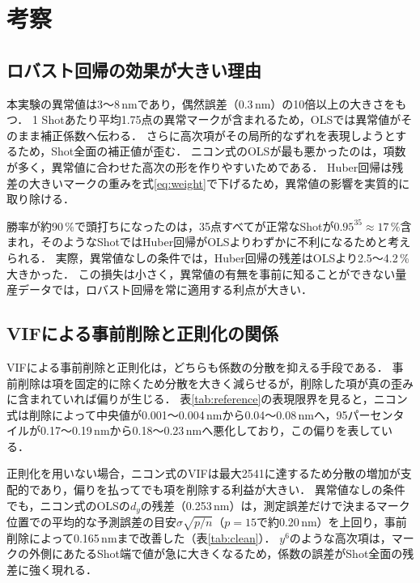 \documentclass[11pt,a4paper]{ltjsarticle}
\begin{document}
\section{考察}

\subsection{ロバスト回帰の効果が大きい理由}

本実験の異常値は3〜8\,nmであり，偶然誤差（0.3\,nm）の10倍以上の大きさをもつ．
1 Shotあたり平均1.75点の異常マークが含まれるため，OLSでは異常値がそのまま補正係数へ伝わる．
さらに高次項がその局所的なずれを表現しようとするため，Shot全面の補正値が歪む．
ニコン式のOLSが最も悪かったのは，項数が多く，異常値に合わせた高次の形を作りやすいためである．
Huber回帰は残差の大きいマークの重みを式\eqref{eq:weight}で下げるため，異常値の影響を実質的に取り除ける．

勝率が約90\,\%で頭打ちになったのは，35点すべてが正常なShotが$0.95^{35}\approx17\,\%$含まれ，そのようなShotではHuber回帰がOLSよりわずかに不利になるためと考えられる．
実際，異常値なしの条件では，Huber回帰の残差はOLSより2.5〜4.2\,\%大きかった．
この損失は小さく，異常値の有無を事前に知ることができない量産データでは，ロバスト回帰を常に適用する利点が大きい．

\subsection{VIFによる事前削除と正則化の関係}

VIFによる事前削除と正則化は，どちらも係数の分散を抑える手段である．
事前削除は項を固定的に除くため分散を大きく減らせるが，削除した項が真の歪みに含まれていれば偏りが生じる．
表\ref{tab:reference}の表現限界を見ると，ニコン式は削除によって中央値が0.001〜0.004\,nmから0.04〜0.08\,nmへ，95パーセンタイルが0.17〜0.19\,nmから0.18〜0.23\,nmへ悪化しており，この偏りを表している．

正則化を用いない場合，ニコン式のVIFは最大2541に達するため分散の増加が支配的であり，偏りを払ってでも項を削除する利益が大きい．
異常値なしの条件でも，ニコン式のOLSの$d_y$の残差（0.253\,nm）は，測定誤差だけで決まるマーク位置での平均的な予測誤差の目安$\sigma\sqrt{p/n}$（$p=15$で約0.20\,nm）を上回り，事前削除によって0.165\,nmまで改善した（表\ref{tab:clean}）．
$y^6$のような高次項は，マークの外側にあたるShot端で値が急に大きくなるため，係数の誤差がShot全面の残差に強く現れる．
\end{document}
